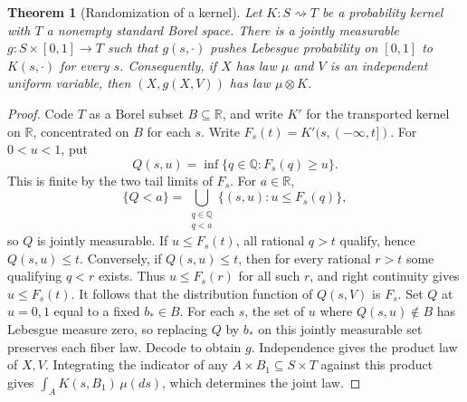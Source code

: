 \documentclass[11pt,oneside,openany]{book}
\theoremstyle{plain}
\newtheorem{theorem}{Theorem}[chapter]
\theoremstyle{definition}
\theoremstyle{remark}
\begin{document}
\begin{theorem}[Randomization of a kernel]\label{thm:kernel-randomization}
Let \(K:S\rightsquigarrow T\) be a probability kernel with \(T\) a nonempty standard Borel space. There is a jointly measurable \(g:S\times[0,1]\to T\) such that \(g(s,\cdot)\) pushes Lebesgue probability on \([0,1]\) to \(K(s,\cdot)\) for every \(s\). Consequently, if \(X\) has law \(\mu\) and \(V\) is an independent uniform variable, then \((X,g(X,V))\) has law \(\mu\otimes K\).
\end{theorem}
\begin{proof}
Code \(T\) as a Borel subset \(B\subseteq\mathbb R\), and write \(K'\) for the transported kernel on \(\mathbb R\), concentrated on \(B\) for each \(s\). Write \(F_s(t)=K'(s,(-\infty,t])\). For \(0<u<1\), put
\[
  Q(s,u)=\inf\{q\in\mathbb Q:F_s(q)\ge u\}.
\]
This is finite by the two tail limits of \(F_s\). For \(a\in\mathbb R\),
\[
 \{Q<a\}=\bigcup_{\substack{q\in\mathbb Q\\q<a}}\{(s,u):u\le F_s(q)\},
\]
so \(Q\) is jointly measurable. If \(u\le F_s(t)\), all rational \(q>t\) qualify, hence \(Q(s,u)\le t\). Conversely, if \(Q(s,u)\le t\), then for every rational \(r>t\) some qualifying \(q<r\) exists. Thus \(u\le F_s(r)\) for all such \(r\), and right continuity gives \(u\le F_s(t)\). It follows that the distribution function of \(Q(s,V)\) is \(F_s\). Set \(Q\) at \(u=0,1\) equal to a fixed \(b_*\in B\). For each \(s\), the set of \(u\) where \(Q(s,u)\notin B\) has Lebesgue measure zero, so replacing \(Q\) by \(b_*\) on this jointly measurable set preserves each fiber law. Decode to obtain \(g\). Independence gives the product law of \(X,V\). Integrating the indicator of any \(A\times B_1\subseteq S\times T\) against this product gives \(\int_A K(s,B_1)\,\mu(ds)\), which determines the joint law.
\end{proof}
\end{document}
